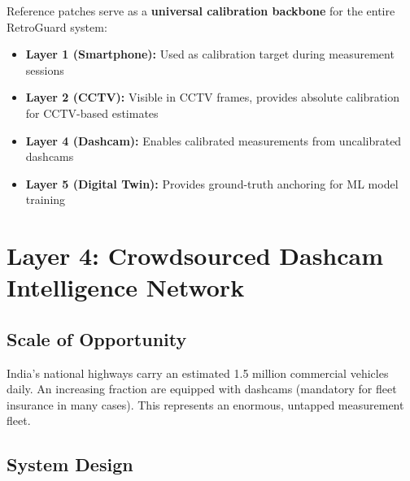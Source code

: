 \documentclass[11pt,a4paper]{article}
\begin{document}
Reference patches serve as a \textbf{universal calibration backbone} for the entire RetroGuard system:

\begin{itemize}[noitemsep]
    \item \textbf{Layer 1 (Smartphone):} Used as calibration target during measurement sessions
    \item \textbf{Layer 2 (CCTV):} Visible in CCTV frames, provides absolute calibration for CCTV-based estimates
    \item \textbf{Layer 4 (Dashcam):} Enables calibrated measurements from uncalibrated dashcams
    \item \textbf{Layer 5 (Digital Twin):} Provides ground-truth anchoring for ML model training
\end{itemize}


\section{Layer 4: Crowdsourced Dashcam Intelligence Network}
\label{sec:layer4}

\subsection{Scale of Opportunity}

India's national highways carry an estimated 1.5 million commercial vehicles daily. An increasing fraction are equipped with dashcams (mandatory for fleet insurance in many cases). This represents an enormous, untapped measurement fleet.

\subsection{System Design}
\end{document}
